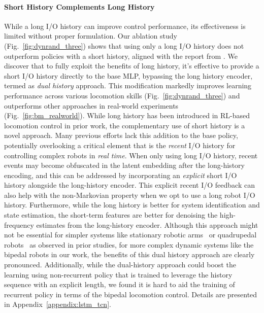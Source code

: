 \paragraph{Short History Complements Long History}\label{subsec:dual_history_advantages}
While a long I/O history can improve control performance, its effectiveness is limited without proper formulation. 
Our ablation study (Fig.~\ref{fig:dynrand_three}) shows that using only a long I/O history does not outperform policies with a short history, aligned with the report from \cite{singh2023learning}.
We discover that to fully exploit the benefits of long history, it's effective to provide a short I/O history directly to the base MLP, bypassing the long history encoder, termed as \emph{dual history} approach.
This modification markedly improves learning performance across various locomotion skills (Fig.~\ref{fig:dynrand_three}) and outperforms other approaches in real-world experiments (Fig.~\ref{fig:bm_realworld}). 
While long history has been introduced in RL-based locomotion control in prior work, the complementary use of short history is a novel approach. 
Many previous efforts lack this addition to the base policy, potentially overlooking a critical element that is the \emph{recent} I/O history for controlling complex robots in \textit{real time}. 
When only using long I/O history, recent events may become obfuscated in the latent embedding after the long-history encoding, and this can be addressed by incorporating an \emph{explicit} short I/O history alongside the long-history encoder. 
This explicit recent I/O feedback can also help with the non-Markovian property when we opt to use a long robot I/O history.
Furthermore, while the long history is better for system identification and state estimation, the short-term features are better for denoising the high-frequency estimates from the long-history encoder.
Although this approach might not be essential for simpler systems like stationary robotic arms~\citep{peng2018sim} or quadrupedal robots~\citep{lee2020learning} as observed in prior studies, for more complex dynamic systems like the bipedal robots in our work, the benefits of this dual history approach are clearly pronounced.
Additionally, while the dual-history approach could boost the learning using non-recurrent policy that is trained to leverage the history sequence with an explicit length, we found it is hard to aid the training of recurrent policy in terms of the bipedal locomotion control. Details are presented in Appendix~\ref{appendix:lstm_tcn}.



